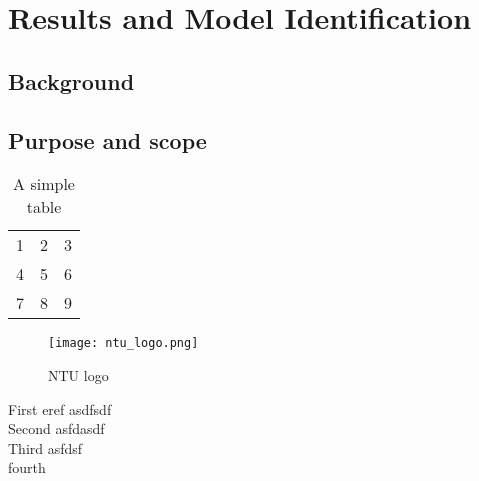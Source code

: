 \chapter{Results and Model Identification}
\section{Background}
\section{Purpose and scope }


\begin{table}[h!]
  \begin{center}
    \begin{tabular}{| l c r |}
    \hline
    1 & 2 & 3 \\
    4 & 5 & 6 \\
    7 & 8 & 9 \\
    \hline
    \end{tabular}
  \end{center}
  \caption{A simple table}
\end{table}

\begin{figure}[h!]  
  \centering
    \texttt{[image: ntu\_logo.png]}
  \caption{NTU logo}
\end{figure}


First eref \cite{Hao14} asdfsdf \\

Second \cite{Beyl11} asfdasdf \\

Third \cite{Bona05} asfdsf\\

fourth \cite{Ohi91} \\
